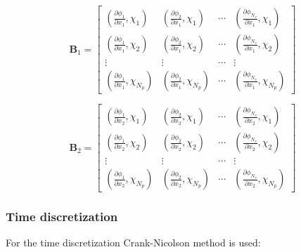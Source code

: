 \begin{equation*}
	\mathbf{B}_1 = \begin{bmatrix}
		\left(\frac{\partial\phi_1}{\partial x_1}, \chi_1\right) & \left(\frac{\partial\phi_2}{\partial x_1}, \chi_1\right) & \cdots & \left(\frac{\partial\phi_{N_v}}{\partial x_1}, \chi_1\right) \\
		\left(\frac{\partial\phi_1}{\partial x_1}, \chi_2\right) & \left(\frac{\partial\phi_2}{\partial x_1}, \chi_2\right) & \cdots & \left(\frac{\partial\phi_{N_v}}{\partial x_1}, \chi_2\right) \\
		\vdots & \vdots & \cdots & \vdots \\
		\left(\frac{\partial\phi_1}{\partial x_1}, \chi_{N_p}\right) & \left(\frac{\partial\phi_2}{\partial x_1}, \chi_{N_p}\right) & \cdots & \left(\frac{\partial\phi_{N_v}}{\partial x_1}, \chi_{N_p}\right)
	\end{bmatrix}
\end{equation*}

\begin{equation*}
\mathbf{B}_2 = \begin{bmatrix}
\left(\frac{\partial\phi_1}{\partial x_2}, \chi_1\right) & \left(\frac{\partial\phi_2}{\partial x_2}, \chi_1\right) & \cdots & \left(\frac{\partial\phi_{N_v}}{\partial x_2}, \chi_1\right) \\
\left(\frac{\partial\phi_1}{\partial x_2}, \chi_2\right) & \left(\frac{\partial\phi_2}{\partial x_2}, \chi_2\right) & \cdots & \left(\frac{\partial\phi_{N_v}}{\partial x_2}, \chi_2\right) \\
\vdots & \vdots & \cdots & \vdots \\
\left(\frac{\partial\phi_1}{\partial x_2}, \chi_{N_p}\right) & \left(\frac{\partial\phi_2}{\partial x_2}, \chi_{N_p}\right) & \cdots & \left(\frac{\partial\phi_{N_v}}{\partial x_2}, \chi_{N_p}\right)
\end{bmatrix}
\end{equation*}

\subsubsection{Time discretization}
For the time discretization Crank-Nicolson method is used:

